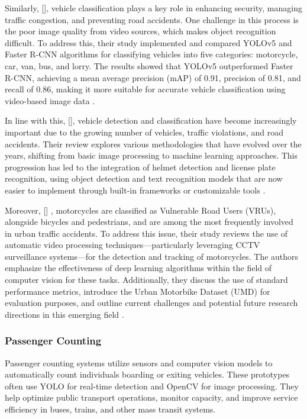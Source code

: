 \begin{refsection}
Similarly, \citeauthor{ong2022vehicle} [\citeyear{ong2022vehicle}], vehicle classification plays a key role in enhancing security, managing traffic congestion, and preventing road accidents. One challenge in this process is the poor image quality from video sources, which makes object recognition difficult. To address this, their study implemented and compared YOLOv5 and Faster R-CNN algorithms for classifying vehicles into five categories: motorcycle, car, van, bus, and lorry. The results showed that YOLOv5 outperformed Faster R-CNN, achieving a mean average precision (mAP) of 0.91, precision of 0.81, and recall of 0.86, making it more suitable for accurate vehicle classification using video-based image data \cite{ong2022vehicle}.

In line with this,\citeauthor{Sanjana2021} [\citeyear{Sanjana2021}], vehicle detection and classification have become increasingly important due to the growing number of vehicles, traffic violations, and road accidents. Their review explores various methodologies that have evolved over the years, shifting from basic image processing to machine learning approaches. This progression has led to the integration of helmet detection and license plate recognition, using object detection and text recognition models that are now easier to implement through built-in frameworks or customizable tools \cite{Sanjana2021}.

Moreover, \citeauthor{Espinosa2021} [\citeyear{Espinosa2021}] , motorcycles are classified as Vulnerable Road Users (VRUs), alongside bicycles and pedestrians, and are among the most frequently involved in urban traffic accidents. To address this issue, their study reviews the use of automatic video processing techniques—particularly leveraging CCTV surveillance systems—for the detection and tracking of motorcycles. The authors emphasize the effectiveness of deep learning algorithms within the field of computer vision for these tasks. Additionally, they discuss the use of standard performance metrics, introduce the Urban Motorbike Dataset (UMD) for evaluation purposes, and outline current challenges and potential future research directions in this emerging field \cite{Espinosa2021}.

\subsubsection{Passenger Counting}
    Passenger counting systems utilize sensors and computer vision models to automatically count individuals boarding or exiting vehicles. These prototypes often use YOLO for real-time detection and OpenCV for image processing. They help optimize public transport operations, monitor capacity, and improve service efficiency in buses, trains, and other mass transit systems.


\end{refsection}
